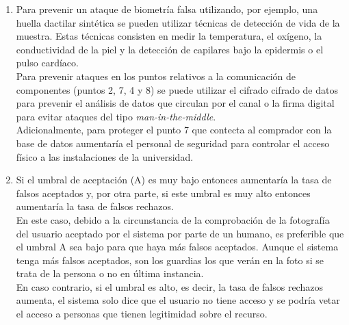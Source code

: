 \documentclass[10pt,a4paper]{article}
\begin{document}
\begin{enumerate}[label=\textbf{\alph*)}]
\item
Para prevenir un ataque de biometría falsa utilizando, por ejemplo, una huella dactilar sintética se pueden utilizar técnicas de detección de vida de la muestra. Estas técnicas consisten en medir la temperatura, el oxígeno, la conductividad de la piel y la detección de capilares bajo la epidermis o el pulso cardíaco.\\
Para prevenir ataques en los puntos relativos a la comunicación de componentes (puntos 2, 7, 4 y 8) se puede utilizar el cifrado cifrado de datos para prevenir el análisis de datos que circulan por el canal o la firma digital para evitar ataques del tipo \textit{man-in-the-middle}.\\
Adicionalmente, para proteger el punto 7 que contecta al comprador con la base de datos aumentaría el personal de seguridad para controlar el acceso físico a las instalaciones de la universidad.
\item 
Si el umbral de aceptación (A) es muy bajo entonces aumentaría la tasa de falsos aceptados y, por otra parte, si este umbral es muy alto entonces aumentaría la tasa de falsos rechazos.\\
En este caso, debido a la circunstancia de la comprobación de la fotografía del usuario aceptado por el sistema por parte de un humano, es preferible que el umbral A sea bajo para que haya más falsos aceptados. Aunque el sistema tenga más falsos aceptados, son los guardias los que verán en la foto si se trata de la persona o no en última instancia.\\
En caso contrario, si el umbral es alto, es decir, la tasa de falsos rechazos aumenta, el sistema solo dice que el usuario no tiene acceso y se podría vetar el acceso a personas que tienen legitimidad sobre el recurso.

\end{enumerate}
\end{document}
